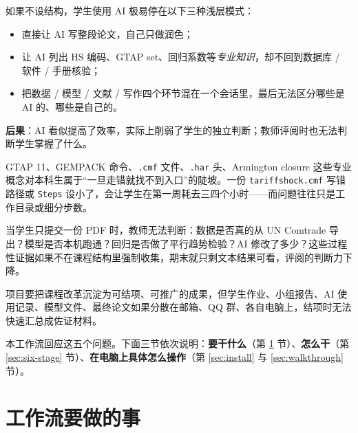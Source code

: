 \documentclass[12pt,a4paper]{article}
\begin{document}
\begin{problembox}[问题 2：AI 工具不规范使用容易退化为``替写'']
如果不设结构，学生使用 AI 极易停在以下三种浅层模式：
\begin{itemize}[leftmargin=*]
  \item 直接让 AI 写整段论文，自己只做润色；
  \item 让 AI 列出 HS 编码、GTAP set、回归系数等\emph{专业知识}，却不回到数据库 / 软件 / 手册核验；
  \item 把数据 / 模型 / 文献 / 写作四个环节混在一个会话里，最后无法区分哪些是 AI 的、哪些是自己的。
\end{itemize}
\textbf{后果}：AI 看似提高了效率，实际上削弱了学生的独立判断；教师评阅时也无法判断学生掌握了什么。
\end{problembox}

\begin{problembox}
GTAP 11、GEMPACK 命令、\texttt{.cmf} 文件、\texttt{.har} 头、Armington closure 这些专业概念对本科生属于``一旦走错就找不到入口''的陡坡。一份 \texttt{tariffshock.cmf} 写错路径或 \texttt{Steps} 设小了，会让学生在第一周耗去三四个小时——而问题往往只是工作目录或细分步数。
\end{problembox}

\begin{problembox}
当学生只提交一份 PDF 时，教师无法判断：数据是否真的从 UN Comtrade 导出？模型是否本机跑通？回归是否做了平行趋势检验？AI 修改了多少？这些过程性证据如果不在课程结构里强制收集，期末就只剩文本结果可看，评阅的判断力下降。
\end{problembox}

\begin{problembox}
项目要把课程改革沉淀为可结项、可推广的成果，但学生作业、小组报告、AI 使用记录、模型文件、最终论文如果分散在邮箱、QQ 群、各自电脑上，结项时无法快速汇总成佐证材料。
\end{problembox}

\medskip
本工作流回应这五个问题。下面三节依次说明：\textbf{要干什么}（第 \ref{sec:goal} 节）、\textbf{怎么干}（第 \ref{sec:six-stage} 节）、\textbf{在电脑上具体怎么操作}（第 \ref{sec:install} 与 \ref{sec:walkthrough} 节）。

\section{工作流要做的事}\label{sec:goal}
\end{document}
